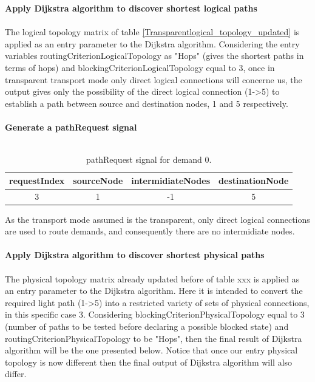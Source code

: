 \textbf{Apply Dijkstra algorithm to discover shortest logical paths}\\ \\

The logical topology matrix of table \ref{Transparentlogical_topology_updated} is applied as an entry parameter to the Dijkstra algorithm. Considering the entry variables routingCriterionLogicalTopology as "Hops" (gives the shortest paths in terms of hops) and blockingCriterionLogicalTopology equal to 3, once in transparent transport mode only direct logical connections will concerne us, the output gives only the possibility of the direct logical connection (1->5) to establish a path between source and destination nodes, 1 and 5 respectively.\\ \\

\textbf{Generate a pathRequest signal}\\ \\

\begin{table}[H]
	\centering
	\begin{tabular}{|c|c|c|c|}
		\hline
		requestIndex & sourceNode & intermidiateNodes & destinationNode \\ \hline
		3            & 1          & -1                 & 5               \\ \hline
	\end{tabular}
	\caption{pathRequest signal for demand 0.}
\end{table} 

As the transport mode assumed is the transparent, only direct logical connections are used to route demands, and consequently there are no intermidiate nodes.\\ \\

\textbf{Apply Dijkstra algorithm to discover shortest physical paths}\\ \\
The physical topology matrix already updated before of table xxx is applied as an entry parameter to the Dijkstra algorithm. Here it is intended to convert the required light path (1->5) into a restricted variety of sets of physical connections, in this specific case 3. Considering blockingCriterionPhysicalTopology equal to 3 (number of paths to be tested before declaring a possible blocked state) and routingCriterionPhysicalTopology to be "Hops", then the final result of Dijkstra algorithm will be the one presented below. Notice that once our entry physical topology is now different then the final output of Dijkstra algorithm will also differ.



